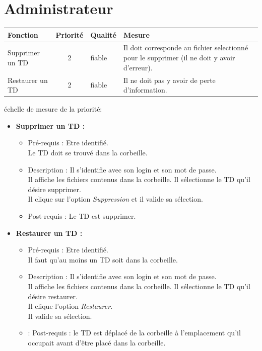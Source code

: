 \section*{Administrateur}
\begin{tabular}{|p{4cm}|c|p{4cm}|p{5cm}|}
\hline
Fonction & Priorit{\'e} & Qualit{\'e} & Mesure \\
\hline
Supprimer un TD & 2 & fiable & Il doit corresponde au fichier selectionn{\'e} pour le supprimer (il ne doit y avoir d'erreur).\\
\hline
Restaurer un TD & 2 & fiable & Il ne doit pas y avoir de perte d'information.\\
\hline
\end{tabular}

\begin{center}
{\'e}chelle de mesure de la priorit{\'e}:

\end{center}

\begin{itemize}
\item {\bf Supprimer un TD :}
	\begin{itemize}
	\item Pr{\'e}-requis : Etre identifi{\'e}.\\
	Le TD doit se trouv{\'e} dans la corbeille.
	\item Description : Il s'identifie avec son login et son mot de passe.\\
	Il affiche les fichiers contenus dans la corbeille. Il s{\'e}lectionne le TD qu'il d{\'e}sire supprimer.\\
	Il clique sur l'option {\it Suppression} et il valide sa s{\'e}lection.
	\item Post-requis : Le TD est supprimer.\\
	\end{itemize}

\item {\bf Restaurer un TD :}
	\begin{itemize}
	\item Pr{\'e}-requis : Etre identifi{\'e}.\\
	Il faut qu'au moins un TD soit dans la corbeille.
	\item Description : Il s'identifie avec son login et son mot de passe.\\
	Il affiche les fichiers contenus dans la corbeille. Il s{\'e}lectionne le TD qu'il d{\'e}sire restaurer.\\
	Il clique l'option {\it Restaurer}.\\
	Il valide sa s{\'e}lection.
	\item : Post-requis : le TD est d{\'e}plac{\'e} de la corbeille {\`a} l'emplacement qu'il occupait avant d'{\^e}tre plac{\'e} dans la corbeille.\\
	\end{itemize}
\end{itemize}


